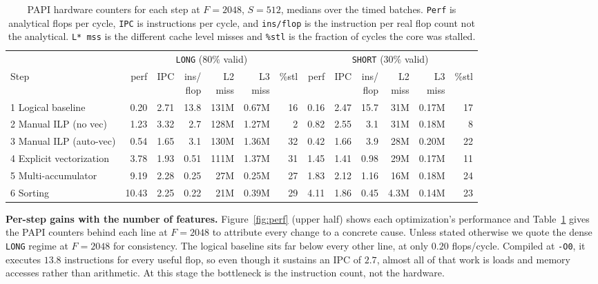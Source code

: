 \documentclass[letterpaper]{article}
\newcommand{\mypar}[1]{{\bf #1.}}
\begin{document}
\begin{table}[t]
  \centering
  \footnotesize
  \caption{PAPI hardware counters for each step at $F=2048$, $S=512$, medians over the timed batches. \texttt{Perf} is analytical flops per cycle, \texttt{IPC} is instructions per cycle, and \texttt{ins/flop} is the instruction per real flop count not the analytical. \texttt{L* mss} is the different cache level misses and  \texttt{\%stl} is the fraction of cycles the core was stalled.}
  \label{tab:papi}
  \begin{tabular}{l rrrrrr @{\hskip 2.2em} rrrrrr}
    \toprule
    & \multicolumn{6}{c}{\texttt{LONG} ($80\%$ valid)} & \multicolumn{6}{c}{\texttt{SHORT} ($30\%$ valid)}\\
    \cmidrule(lr){2-7}\cmidrule(lr){8-13}
    Step & perf & IPC & \shortstack{ins/\\flop} & \shortstack{L2\\miss} & \shortstack{L3\\miss} & \%stl & perf & IPC & \shortstack{ins/\\flop} & \shortstack{L2\\miss} & \shortstack{L3\\miss} & \%stl\\
    \midrule
    1 Logical baseline        & 0.20 & 2.71 & 13.8 & 131M & 0.67M & 16 & 0.16 & 2.47 & 15.7 & 31M & 0.17M & 17\\
    2 Manual ILP (no vec)     & 1.23 & 3.32 & 2.7  & 128M & 1.27M &  2 & 0.82 & 2.55 & 3.1  & 31M & 0.18M &  8\\
    3 Manual ILP (auto-vec)   & 0.54 & 1.65 & 3.1  & 130M & 1.36M & 32 & 0.42 & 1.66 & 3.9  & 28M & 0.20M & 22\\
    4 Explicit vectorization  & 3.78 & 1.93 & 0.51 & 111M & 1.37M & 31 & 1.45 & 1.41 & 0.98 & 29M & 0.17M & 11\\
    5 Multi-accumulator       & 9.19 & 2.28 & 0.25 &  27M & 0.25M & 27 & 1.83 & 2.12 & 1.16 & 16M & 0.18M & 24\\
    6 Sorting                 &10.43 & 2.25 & 0.22 &  21M & 0.39M & 29 & 4.11 & 1.86 & 0.45 & 4.3M& 0.14M & 23\\
    \bottomrule
  \end{tabular}
\end{table}

\mypar{Per-step gains with the number of features}
Figure~\ref{fig:perf} (upper half) shows each optimization's performance and Table~\ref{tab:papi} gives the PAPI counters behind each line at $F=2048$ to attribute every change to a concrete cause. Unless stated otherwise we quote the dense \texttt{LONG} regime at $F=2048$ for consistency. The logical baseline sits far below every other line, at only $0.20$ flops/cycle. Compiled at \texttt{-O0}, it executes $13.8$ instructions for every useful flop, so even though it sustains an IPC of $2.7$, almost all of that work is loads and memory accesses rather than arithmetic. At this stage the bottleneck is the instruction count, not the hardware.
\end{document}
